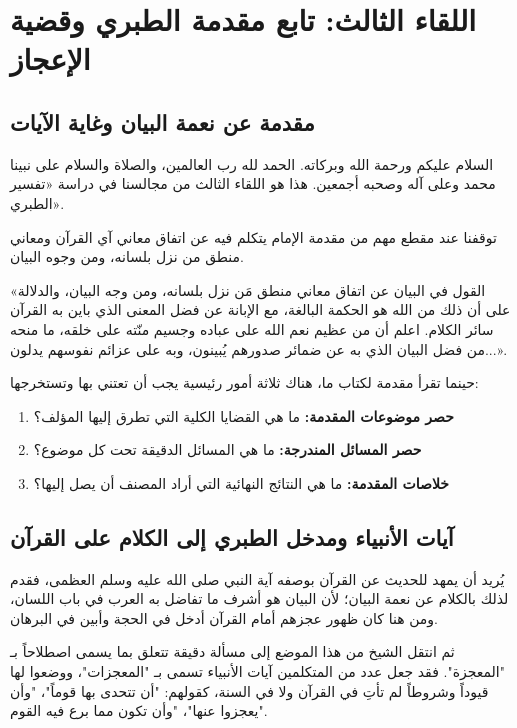 \chapter{اللقاء الثالث: تابع مقدمة الطبري وقضية الإعجاز}

\section{مقدمة عن نعمة البيان وغاية الآيات}
السلام عليكم ورحمة الله وبركاته. الحمد لله رب العالمين، والصلاة والسلام على نبينا محمد وعلى آله وصحبه أجمعين. هذا هو اللقاء الثالث من مجالسنا في دراسة «تفسير الطبري». 

توقفنا عند مقطع مهم من مقدمة الإمام  يتكلم فيه عن اتفاق معاني آي القرآن ومعاني منطق من نزل بلسانه، ومن وجوه البيان.

  
«القول في البيان عن اتفاق معاني منطق مَن نزل بلسانه، ومن وجه البيان، والدلالة على أن ذلك من الله هو الحكمة البالغة، مع الإبانة عن فضل المعنى الذي باين به القرآن سائر الكلام. اعلم أن من عظيم نعم الله على عباده وجسيم منّته على خلقه، ما منحه من فضل البيان الذي به عن ضمائر صدورهم يُبينون، وبه على عزائم نفوسهم يدلون...».

\begin{fawaid}
حينما تقرأ مقدمة لكتاب ما، هناك ثلاثة أمور رئيسية يجب أن تعتني بها وتستخرجها:
\begin{enumerate}
    \item \textbf{حصر موضوعات المقدمة:} ما هي القضايا الكلية التي تطرق إليها المؤلف؟
    \item \textbf{حصر المسائل المندرجة:} ما هي المسائل الدقيقة تحت كل موضوع؟
    \item \textbf{خلاصات المقدمة:} ما هي النتائج النهائية التي أراد المصنف أن يصل إليها؟
\end{enumerate}
\end{fawaid}

\section{آيات الأنبياء ومدخل الطبري إلى الكلام على القرآن}
يُريد  أن يمهد للحديث عن القرآن بوصفه آية النبي صلى الله عليه وسلم العظمى، فقدم لذلك بالكلام عن نعمة البيان؛ لأن البيان هو أشرف ما تفاضل به العرب في باب اللسان، ومن هنا كان ظهور عجزهم أمام القرآن أدخل في الحجة وأبين في البرهان.

ثم انتقل الشيخ من هذا الموضع إلى مسألة دقيقة تتعلق بما يسمى اصطلاحاً بـ "المعجزة". فقد جعل عدد من المتكلمين آيات الأنبياء تسمى بـ "المعجزات"، ووضعوا لها قيوداً وشروطاً لم تأتِ في القرآن ولا في السنة، كقولهم: "أن تتحدى بها قوماً"، "وأن يعجزوا عنها"، "وأن تكون مما برع فيه القوم".

